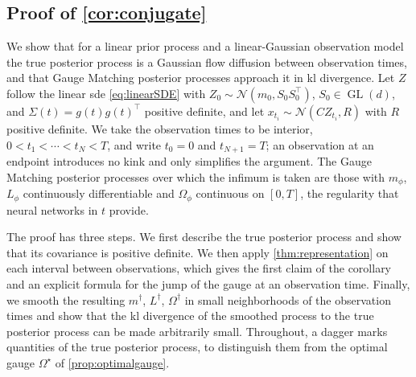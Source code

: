 \documentclass{article} %
\newcommand{\vol}{g}
\newcommand{\gauge}{\Omega}
\newcommand{\gl}{\operatorname{GL}}
\newcommand{\Norm}{\mathcal{N}}
\begin{document}
\subsection{Proof of \texorpdfstring{\cref{cor:conjugate}}{Corollary 4}}\label{sec:proofconjugate}

We show that for a linear prior process and a linear-Gaussian observation model the true posterior process is a Gaussian flow diffusion between observation times, and that Gauge Matching posterior processes approach it in \gls{kl} divergence. Let $Z$ follow the linear \gls{sde} \cref{eq:linearSDE} with $Z_0 \sim \Norm(m_0, S_0 S_0^\top)$, $S_0 \in \gl(d)$, and $\Sigma(t) = \vol(t) \vol(t)^\top$ positive definite, and let $x_{t_i} \sim \Norm(C Z_{t_i}, R)$ with $R$ positive definite. We take the observation times to be interior, $0 < t_1 < \cdots < t_N < T$, and write $t_0 = 0$ and $t_{N+1} = T$; an observation at an endpoint introduces no kink and only simplifies the argument. The Gauge Matching posterior processes over which the infimum is taken are those with $m_\phi$, $L_\phi$ continuously differentiable and $\gauge_\phi$ continuous on $[0, T]$, the regularity that neural networks in $t$ provide.

The proof has three steps. We first describe the true posterior process and show that its covariance is positive definite. We then apply \cref{thm:representation} on each interval between observations, which gives the first claim of the corollary and an explicit formula for the jump of the gauge at an observation time. Finally, we smooth the resulting $m^\dagger$, $L^\dagger$, $\gauge^\dagger$ in small neighborhoods of the observation times and show that the \gls{kl} divergence of the smoothed process to the true posterior process can be made arbitrarily small. Throughout, a dagger marks quantities of the true posterior process, to distinguish them from the optimal gauge $\gauge^\star$ of \cref{prop:optimalgauge}.
\end{document}
